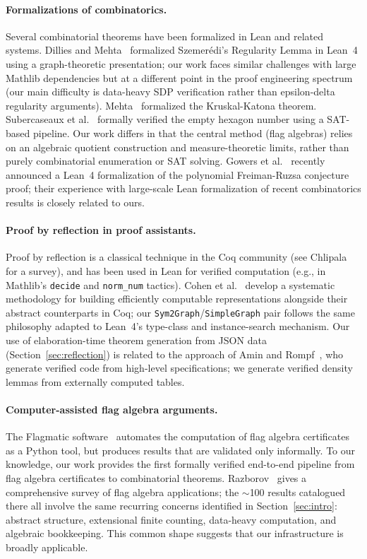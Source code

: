 \documentclass{article}
\newcommand{\lean}[1]{\texttt{#1}}
\begin{document}
\paragraph{Formalizations of combinatorics.}
Several combinatorial theorems have been formalized in Lean and related
systems.  Dillies and Mehta~\cite{dillies2022szemeredi} formalized
Szemer\'edi's Regularity Lemma in Lean~4 using a graph-theoretic presentation;
our work faces similar challenges with large Mathlib dependencies but at a
different point in the proof engineering spectrum (our main difficulty is
data-heavy SDP verification rather than epsilon-delta regularity arguments).
Mehta~\cite{mehta2022kruskal} formalized the Kruskal-Katona theorem.
Subercaseaux et al.~\cite{subercaseaux2024hexagon}
formally verified the empty hexagon number using a SAT-based pipeline.  Our
work differs in that the central method (flag algebras) relies on an algebraic
quotient construction and measure-theoretic limits, rather than purely
combinatorial enumeration or SAT solving.
Gowers et al.~\cite{gowers2024formalizing} recently announced a Lean~4
formalization of the polynomial Freiman-Ruzsa conjecture proof; their experience
with large-scale Lean formalization of recent combinatorics results is closely
related to ours.

\paragraph{Proof by reflection in proof assistants.}
Proof by reflection is a classical technique in the Coq community (see
Chlipala~\cite{chlipala2013cpdt} for a survey), and has been used
in Lean for verified computation (e.g., in Mathlib's \lean{decide} and
\lean{norm\_num} tactics).  Cohen et al.~\cite{cohen2013refinements}
develop a systematic methodology for building efficiently computable
representations alongside their abstract counterparts in Coq; our
\lean{Sym2Graph}/\lean{SimpleGraph} pair follows the same philosophy
adapted to Lean~4's type-class and instance-search mechanism.
Our use of elaboration-time theorem generation from JSON data (Section~\ref{sec:reflection})
is related to the approach of Amin and Rompf~\cite{amin2017collapsing},
who generate verified code from high-level specifications; we generate
verified density lemmas from externally computed tables.

\paragraph{Computer-assisted flag algebra arguments.}
The Flagmatic software~\cite{vaughan2013flagmatic} automates the
computation of flag algebra certificates as a Python tool, but produces results
that are validated only informally.  To our knowledge, our work provides the
first formally verified end-to-end pipeline from flag algebra certificates to
combinatorial theorems.  Razborov~\cite{razborov2013flag} gives a
comprehensive survey of
flag algebra applications; the $\sim$100 results catalogued there all involve
the same recurring concerns identified in Section~\ref{sec:intro}: abstract
structure, extensional finite counting, data-heavy computation, and algebraic
bookkeeping.  This common shape suggests that our infrastructure is broadly
applicable.
\end{document}
